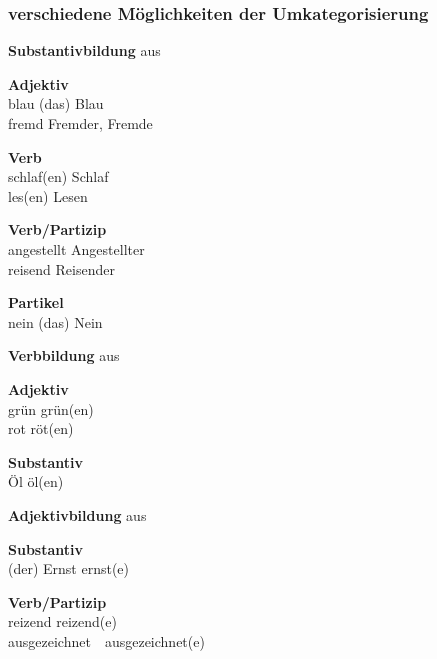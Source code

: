\begin{frame}
\frametitle{verschiedene Möglichkeiten der Umkategorisierung}


\medskip 

\begin{minipage}[t][][t]{.47\textwidth}

\textbf{Substantivbildung} aus

\ea \textbf{Adjektiv}\\
blau \ras (das) Blau\\
fremd \ras {}Fremder, Fremde

\ex \textbf{Verb}\\
schlaf(en) \ras {}Schlaf \\
les(en) \ras  {}Lesen

\ex \textbf{Verb/Partizip}\\
angestellt \ras {}Angestellter\\ 
reisend \ras   {}Reisender

\ex \textbf{Partikel}\\
nein \ras  (das)  Nein

\z

\end{minipage}
\pause 
\hfill 
\begin{minipage}[t][][t]{.51\textwidth}
\textbf{Verbbildung} aus 

\ea \textbf{Adjektiv}\\
grün \ras  {}grün(en)\\ 
rot \ras  {}röt(en)

\ex \textbf{Substantiv}\\
Öl \ras  {}öl(en)
\z

\pause 
\medskip 

\textbf{Adjektivbildung} aus

\ea \textbf{Substantiv}\\
(der) Ernst \ras  {}ernst(e)

\ex \textbf{Verb/Partizip}\\
reizend \ras  {}reizend(e) \\
ausgezeichnet~\ra~ausgezeichnet(e)
\z


\end{minipage}

\end{frame}


